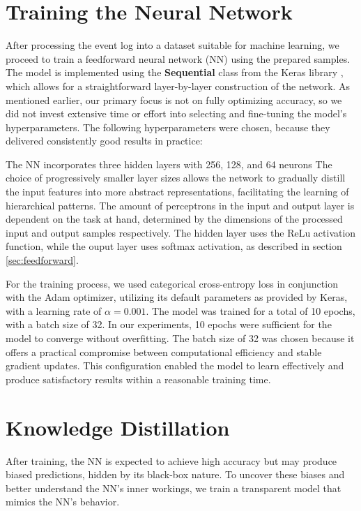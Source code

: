 
\section{Training the Neural Network}
\label{sec:training}
After processing the event log into a dataset suitable for machine learning,
we proceed to train a feedforward neural network (NN) using the prepared samples.
The model is implemented using the \textbf{Sequential} class from the Keras library \cite{keras},
which allows for a straightforward layer-by-layer construction of the network.
As mentioned earlier, our primary focus is not on fully optimizing accuracy,
so we did not invest extensive time or effort into selecting and fine-tuning the model's hyperparameters.
The following hyperparameters were chosen, because they delivered consistently good results in practice:

The NN incorporates three hidden layers with 256, 128, and 64 neurons
The choice of progressively smaller layer sizes allows the network to gradually distill
the input features into more abstract representations, facilitating the learning of hierarchical patterns. 
The amount of perceptrons in the input and output layer is dependent on the task at hand,
determined by the dimensions of the processed input and output samples respectively.
The hidden layer uses the ReLu activation function,
while the ouput layer uses softmax activation, as described in section \ref{sec:feedforward}.

For the training process, we used categorical cross-entropy loss in conjunction with the Adam optimizer,
utilizing its default parameters as provided by Keras, with a learning rate of $\alpha = 0.001$.
The model was trained for a total of 10 epochs, with a batch size of 32.
In our experiments, 10 epochs were sufficient for the model to converge without overfitting.
The batch size of 32 was chosen because it offers a practical compromise
between computational efficiency and stable gradient updates.
This configuration enabled the model to learn effectively
and produce satisfactory results within a reasonable training time.


\section{Knowledge Distillation}
After training, the NN is expected to achieve high accuracy but may produce biased predictions,
hidden by its black-box nature.
To uncover these biases and better understand the NN's inner workings,
we train a transparent model that mimics the NN's behavior.


